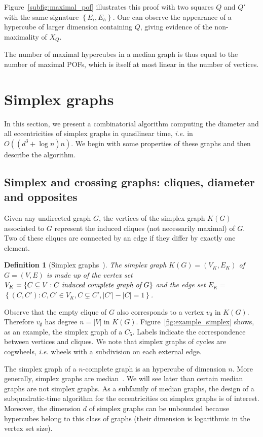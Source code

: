 \documentclass{article}
\newtheorem{definition}{Definition}
\newcommand{\set}[1]{\left\{ #1 \right\}}
\newcommand{\card}[1]{\left| #1 \right|}
\begin{document}
Figure~\ref{subfig:maximal_pof} illustrates this proof with two squares $Q$ and $Q'$ with the same signature $\set{E_i,E_h}$. One can observe the appearance of a hypercube of larger dimension containing $Q$, giving evidence of the non-maximality of $X_Q$.

The number of maximal hypercubes in a median graph is thus equal to the number of maximal POFs, which is itself at most linear in the number of vertices.

\section{Simplex graphs} \label{sec:simplex}

In this section, we present a combinatorial algorithm computing the diameter and all eccentricities of simplex graphs in quasilinear time, {\em i.e.} in $O((d^3+\log n)n)$. We begin with some properties of these graphs and then describe the algorithm.

\subsection{Simplex and crossing graphs: cliques, diameter and opposites} \label{subsec:crossing}

Given any undirected graph $G$, the vertices of the simplex graph $K(G)$ associated to $G$ represent the induced cliques (not necessarily maximal) of $G$. Two of these cliques are connected by an edge if they differ by exactly one element.

\begin{definition}[Simplex graphs~\cite{BaCh08}]
The simplex graph $K(G)=(V_K,E_K)$ of $G=(V,E)$ is made up of the vertex set $V_K = \set{C\subseteq V: C ~\emph{induced complete graph of}~ G}$ and the edge set $E_K = $\\ $\set{(C,C') : C,C' \in V_K, C \subsetneq C', \card{C'}-\card{C} = 1}$.
\label{def:simplex}
\end{definition}

Observe that the empty clique of $G$ also corresponds to a vertex $v_{\emptyset}$ in $K(G)$.  Therefore $v_{\emptyset}$ has degree $n = \card{V}$ in $K(G)$. Figure~\ref{fig:example_simplex} shows, as an example, the simplex graph of a $C_5$. Labels indicate the correspondence between vertices and cliques. We note that simplex graphs of cycles are cogwheels, {\em i.e.} wheels with a subdivision on each external edge.

The simplex graph of a $n$-complete graph is an hypercube of dimension $n$. More generally, simplex graphs are median~\cite{BaCh08,BaLeMo86}. We will see later than certain median graphs are not simplex graphs. As a subfamily of median graphs, the design of a subquadratic-time algorithm for the eccentricities on simplex graphs is of interest. Moreover, the dimension $d$ of simplex graphs can be unbounded because hypercubes belong to this class of graphs (their dimension is logarithmic in the vertex set size).
\end{document}
